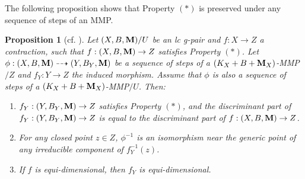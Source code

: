 \documentclass[11pt]{amsart}
\numberwithin{equation}{section}
\newcommand{\Mm}{{\bf{M}}}
\newtheorem{prop}[thm]{Proposition}
\theoremstyle{definition}
\theoremstyle{definition}
\theoremstyle{definition}
\begin{document}
The following proposition shows that Property $(*)$ is preserved under any sequence of steps of an MMP.
\begin{prop}[cf. {\cite[Proposition 2.18]{ACSS21}}]\label{prop: MMP preserves *}
Let $(X,B,\Mm)/U$ be an lc g-pair and $f: X\rightarrow Z$ a contraction, such that $f: (X,B,\Mm)\rightarrow Z$ satisfies Property $(*)$. Let $\phi: (X,B,\Mm)\dashrightarrow (Y,B_Y,\Mm)$ be a sequence of steps of a $(K_X+B+\Mm_X)$-MMP$/Z$ and $f_Y: Y\rightarrow Z$ the induced morphism. Assume that $\phi$ is also a sequence of steps of a $(K_X+B+\Mm_X)$-MMP$/U$. Then:
\begin{enumerate}
    \item $f_Y: (Y,B_Y,\Mm)\rightarrow Z$ satisfies Property $(*)$, and the discriminant part of $f_Y: (Y,B_Y,\Mm)\rightarrow Z$ is equal to the discriminant part of $f: (X,B,\Mm)\rightarrow Z$.
    \item For any closed point $z\in Z$, $\phi^{-1}$ is an isomorphism near the generic point of any irreducible component of $f_Y^{-1}(z)$.
    \item If $f$ is equi-dimensional, then $f_Y$ is equi-dimensional.
\end{enumerate}
\end{prop}
\end{document}
